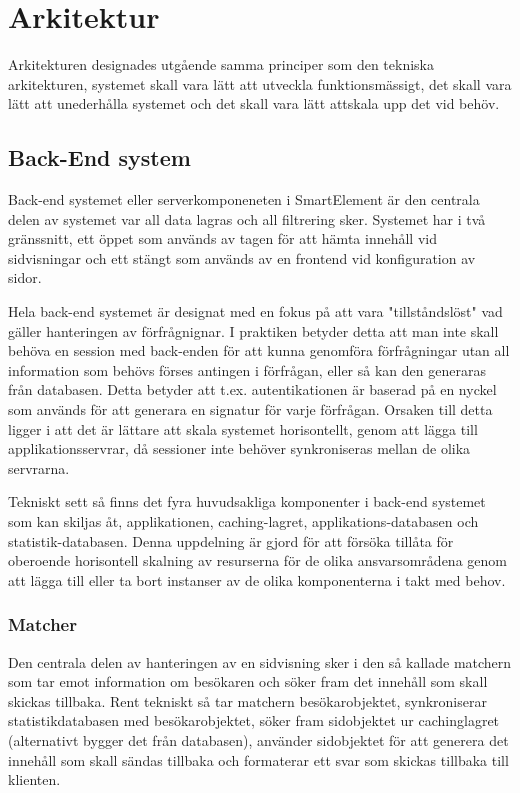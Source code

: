 \section{Arkitektur}

Arkitekturen designades utgående samma principer som den tekniska arkitekturen, systemet skall vara lätt att utveckla funktionsmässigt, det skall vara lätt att unederhålla systemet och det skall vara lätt attskala upp det vid behöv. 

\subsection{Back-End system}

Back-end systemet eller serverkomponeneten i SmartElement är den centrala delen av systemet var all data lagras och all filtrering sker. Systemet har i två gränssnitt, ett öppet som används av tagen för att hämta innehåll vid sidvisningar och ett stängt som används av en frontend vid konfiguration av sidor.

Hela back-end systemet är designat med en fokus på att vara "tillståndslöst" vad gäller hanteringen av förfrågnignar. I praktiken betyder detta att man inte skall behöva en session med back-enden för att kunna genomföra förfrågningar utan all information som behövs förses antingen i förfrågan, eller så kan den generaras från databasen. Detta betyder att t.ex. autentikationen är baserad på en nyckel som används för att generara en signatur för varje förfrågan. Orsaken till detta ligger i att det är lättare att skala systemet horisontellt, genom att lägga till applikationsservrar, då sessioner inte behöver synkroniseras mellan de olika servrarna.

Tekniskt sett så finns det fyra huvudsakliga komponenter i back-end systemet som kan skiljas åt, applikationen, caching-lagret, applikations-databasen och statistik-databasen. Denna uppdelning är gjord för att försöka tillåta för oberoende horisontell skalning av resurserna för de olika ansvarsområdena genom att lägga till eller ta bort instanser av de olika komponenterna i takt med behov.


\subsubsection{Matcher}

Den centrala delen av hanteringen av en sidvisning sker i den så kallade matchern som tar emot information om besökaren och söker fram det innehåll som skall skickas tillbaka. Rent tekniskt så tar matchern besökarobjektet, synkroniserar statistikdatabasen med besökarobjektet, söker fram sidobjektet ur cachinglagret (alternativt bygger det från databasen), använder sidobjektet för att generera det innehåll som skall sändas tillbaka och formaterar ett svar som skickas tillbaka till klienten.

